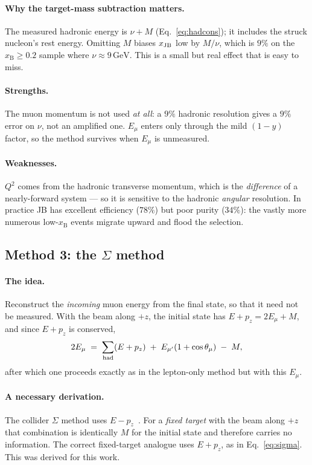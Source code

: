 \documentclass[11pt,a4paper]{article}
\newcommand{\xB}{x_{\mathrm{B}}}
\newcommand{\Ein}{E_{\mu}}
\newcommand{\Eout}{E_{\mu'}}
\newcommand{\thmu}{\theta_{\mu}}
\newcommand{\GeV}{\,\mathrm{GeV}}
\begin{document}
\paragraph{Why the target-mass subtraction matters.} The measured hadronic energy
is $\nu+M$ (Eq.~\ref{eq:hadcons}); it includes the struck nucleon's rest energy.
Omitting $M$ biases $x_{\rm JB}$ low by $M/\nu$, which is $9\%$ on the
$\xB\geq0.2$ sample where $\nu\approx9\GeV$. This is a small but real effect that
is easy to miss.

\paragraph{Strengths.} The muon momentum is not used \emph{at all}: a $9\%$
hadronic resolution gives a $9\%$ error on $\nu$, not an amplified one. $\Ein$
enters only through the mild $(1-y)$ factor, so the method survives when $\Ein$
is unmeasured.

\paragraph{Weaknesses.} $Q^2$ comes from the hadronic transverse momentum, which
is the \emph{difference} of a nearly-forward system --- so it is sensitive to the
hadronic \emph{angular} resolution. In practice JB has excellent efficiency
($78\%$) but poor purity ($34\%$): the vastly more numerous low-$\xB$ events
migrate upward and flood the selection.

\subsection{Method 3: the $\Sigma$ method}
\label{sec:sigma}

\paragraph{The idea.} Reconstruct the \emph{incoming} muon energy from the final
state, so that it need not be measured. With the beam along $+z$, the initial
state has $E+p_z = 2\Ein + M$, and since $E+p_z$ is conserved,
\begin{equation}
  2\Ein \;=\; \sum_{\rm had}(E+p_z) \;+\; \Eout(1+\cos\thmu) \;-\; M ,
  \label{eq:sigma}
\end{equation}
after which one proceeds exactly as in the lepton-only method but with this
$\Ein$.

\paragraph{A necessary derivation.} The collider $\Sigma$ method uses
$E-p_z$~\cite{bassler}. For a \emph{fixed target} with the beam along $+z$ that
combination is identically $M$ for the initial state and therefore carries no
information. The correct fixed-target analogue uses $E+p_z$, as in
Eq.~\ref{eq:sigma}. This was derived for this work.
\end{document}
